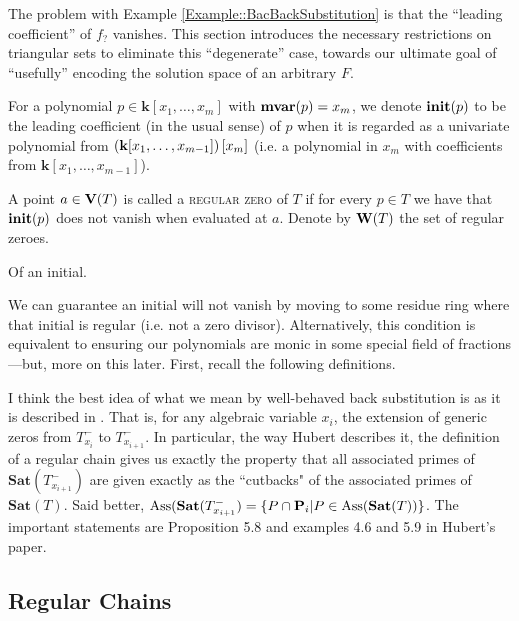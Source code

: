 \documentclass[12pt]{article}
\newcommand{\kk}{\mathbf{k}}
\begin{document}
The problem with Example \ref{Example::BacBackSubstitution} is that the ``leading coefficient'' of $f_?$ vanishes. This section introduces the necessary restrictions on triangular sets to eliminate this ``degenerate'' case, towards our ultimate goal of ``usefully'' encoding the solution space of an arbitrary $F$.

\begin{definition}[Initial]
For a polynomial $p \in \kk[x_1,\ldots,x_m]$ with $\textbf{mvar}(p)=x_m$, we denote $\textbf{init}(p)$ to be the leading coefficient (in the usual sense) of $p$ when it is regarded as a univariate polynomial from $\brac{\kk[x_1,\ldots,x_{m-1}]}[x_m]$ (i.e. a polynomial in $x_m$ with coefficients from $\kk[x_1,\ldots,x_{m-1}]$).
\end{definition}

\begin{definition}
A point $a\in\mathbf{V}(T)$ is called a \textsc{regular zero} of $T$ if for every $p\in T$ we have that $\textbf{init}(p)$ does not vanish when evaluated at $a$.  Denote by $\mathbf{W}(T)$ the set of regular zeroes.  
\end{definition}

\begin{example} Of an initial.
\end{example}

We can guarantee an initial will not vanish by moving to some residue ring where that initial is regular (i.e. not a zero divisor). Alternatively, this condition is equivalent to ensuring our polynomials are monic in some special field of fractions---but, more on this later. First, recall the following definitions.

{\color{red}
\begin{remark}
I think the best idea of what we mean by well-behaved back substitution is as it is described in \cite{H03}.  That is, for any algebraic variable $x_i$, the extension of generic zeros from $T_{x_i}^{-}$ to $T_{x_{i+1}}^{-}$.  In particular, the way Hubert describes it, the definition of a regular chain gives us exactly the property that all associated primes of $\textbf{Sat}(T_{x_{i+1}}^{-})$ are given exactly as the ``cutbacks" of the associated primes of $\textbf{Sat}(T)$.  Said better, $\text{Ass}(\textbf{Sat}(T_{x_{i+1}}^{-}) = \{P\cap\mathbf{P}_{i}|P\in\text{Ass}(\textbf{Sat}(T))\}$.  The important statements are Proposition 5.8 and examples 4.6 and 5.9 in Hubert's paper. 
\end{remark}}
\subsection{Regular Chains}
\end{document}
